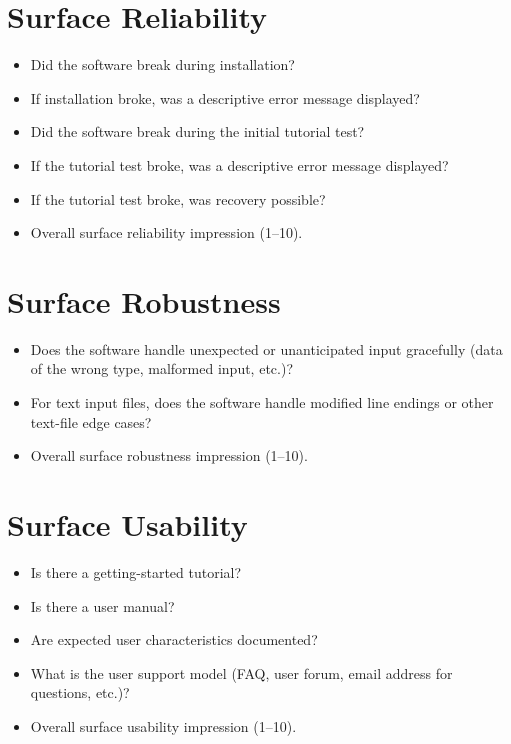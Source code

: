 \section*{Surface Reliability}

\begin{itemize}
    \item Did the software break during installation?
    \item If installation broke, was a descriptive error message displayed?
    \item Did the software break during the initial tutorial test?
    \item If the tutorial test broke, was a descriptive error message displayed?
    \item If the tutorial test broke, was recovery possible?
    \item Overall surface reliability impression (1--10).
\end{itemize}

\section*{Surface Robustness}

\begin{itemize}
    \item Does the software handle unexpected or unanticipated input gracefully (data of the wrong type, malformed input, etc.)?
    \item For text input files, does the software handle modified line endings or other text-file edge cases?
    \item Overall surface robustness impression (1--10).
\end{itemize}

\section*{Surface Usability}

\begin{itemize}
    \item Is there a getting-started tutorial?
    \item Is there a user manual?
    \item Are expected user characteristics documented?
    \item What is the user support model (FAQ, user forum, email address for questions, etc.)?
    \item Overall surface usability impression (1--10).
\end{itemize}

